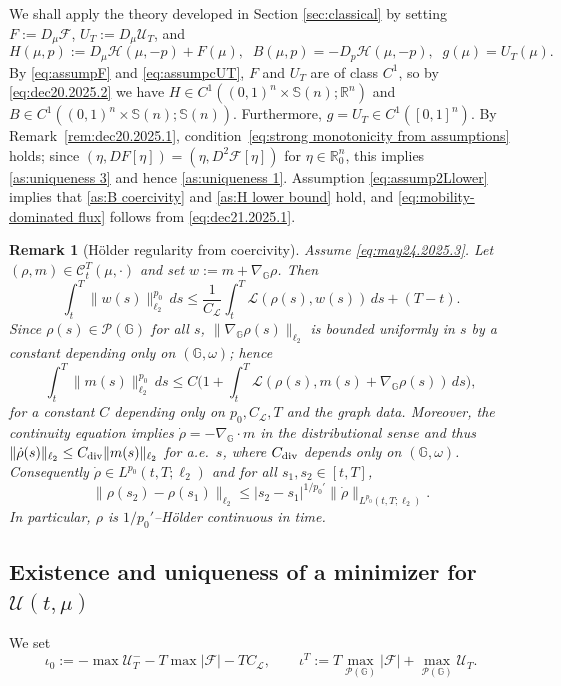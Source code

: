 \documentclass[10pt]{article}
\newtheorem{remark}[theorem]{Remark}
\numberwithin{equation}{section}
\newcommand{\cC}{ \mathcal{C}}
\newcommand{\cF}{ \mathcal{F}}
\newcommand{\cH}{ \mathcal{H}}
\newcommand{\cL}{ \mathcal{L}}
\newcommand{\cP}{ \mathcal{P}}
\newcommand{\cU}{ \mathcal{U}}
\newcommand{\bG}{\mathbb G}
\newcommand{\bR}{\mathbb R}
\newcommand{\R}{\mathbb R}
\newcommand{\bS}{\mathbb S}
\def\R{{\mathbb{R}}}
\def\cH{\mathcal{H}}
\def\cL{\mathcal{L}}
\def\G{\mathbb{G}}
\begin{document}
We shall apply the theory developed in Section \ref{sec:classical} by setting $F:= D_\mu \cF$, $U_T:= D_\mu \cU_T$, and
\begin{equation}\label{eq:define-all-functions}
H(\mu, p):=D_\mu\cH(\mu, -p)+F(\mu), \;\; B(\mu, p)=-D_p\cH(\mu, -p), \;\; g(\mu)=U_T(\mu).
\end{equation}
By \eqref{eq:assumpF} and \eqref{eq:assumpcUT}, $F$ and $U_T$ are of class $C^1$, so by \eqref{eq:dec20.2025.2} we have $H \in C^1((0,1)^n \times \bS(n);\R^n)$ and $B\in C^1((0,1)^n\times \bS(n);\bS(n))$. Furthermore, $g = U_T \in C^1([0,1]^n)$. By Remark~\ref{rem:dec20.2025.1}, condition~\eqref{eq:strong monotonicity from assumptions} holds; since $(\eta, DF[\eta]) = (\eta, D^2\cF[\eta])$ for $\eta \in \bR^n_0$, this implies \eqref{as:uniqueness 3} and hence \eqref{as:uniqueness 1}. Assumption \eqref{eq:assump2Llower} implies that \eqref{as:B coercivity} and \eqref{as:H lower bound} hold, and \eqref{eq:mobility-dominated flux} follows from \eqref{eq:dec21.2025.1}.
%
%
%
\begin{remark}[H\"older regularity from coercivity]\label{rem:dec22.2025.1}
Assume \eqref{eq:may24.2025.3}. Let $(\rho,m)\in \cC_t^T(\mu,\cdot)$ and set $w:=m+\nabla_\bG\rho$. Then
\[
\int_t^T \|w(s)\|_{\ell_2}^{p_0}\,ds
\le \frac{1}{C_{\cL}}\int_t^T \cL(\rho(s),w(s))\,ds + (T-t).
\]
Since $\rho(s)\in \cP(\bG)$ for all $s$, $\|\nabla_\bG\rho(s)\|_{\ell_2}$ is bounded uniformly in $s$ by a constant depending only on $(\bG,\omega)$; hence
\[
\int_t^T \|m(s)\|_{\ell_2}^{p_0}\,ds
\le C\Big(1+\int_t^T \cL(\rho(s),m(s)+\nabla_\bG\rho(s))\,ds\Big),
\]
for a constant $C$ depending only on $p_0,C_{\cL},T$ and the graph data.
Moreover, the continuity equation implies $\dot\rho=-\nabla_\bG\cdot m$ in the distributional sense and thus
$\|\dot\rho(s)\|_{\ell_2}\le C_{\rm div}\|m(s)\|_{\ell_2}$ for a.e.\ $s$, where $C_{\rm div}$ depends only on $(\G,\omega)$.
Consequently $\dot\rho\in L^{p_0}(t,T;\ell_2)$ and for all $s_1,s_2\in[t,T]$,
\[
\|\rho(s_2)-\rho(s_1)\|_{\ell_2}
\le |s_2-s_1|^{1/p_0'}\|\dot\rho\|_{L^{p_0}(t,T;\ell_2)}.
\]
In particular, $\rho$ is $1/p_0'$--H\"older continuous in time.
\end{remark}



% 
%
\subsection{Existence and uniqueness of a minimizer for \texorpdfstring{$\cU(t, \mu)$}{U(t,mu)}}
%
We set  
\begin{equation}\label{eq:june15.2025.1}
\iota_0:=-\max \cU_T^- -T \max |\cF| - TC_{\cL}, \qquad \iota^T:=T \max_{\cP(\bG)} |\cF|+ \max_{\cP(\bG)} \cU_T.
\end{equation}
\end{document}
